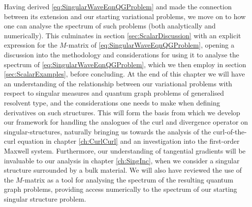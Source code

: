 Having derived \eqref{eq:SingularWaveEqnQGProblem} and made the connection between its extension and our starting variational problems, we move on to how one can analyse the spectrum of such problems (both analytically and numerically).
This culminates in section \ref{sec:ScalarDiscussion} with an explicit expression for the $M$-matrix of \eqref{eq:SingularWaveEqnQGProblem}, opening a discussion into the methodology and considerations for using it to analyse the spectrum of \eqref{eq:SingularWaveEqnQGProblem}, which we then employ in section \ref{sec:ScalarExamples}, before concluding.
At the end of this chapter we will have an understanding of the relationship between our variational problems with respect to singular measures and quantum graph problems of generalised resolvent type, and the considerations one needs to make when defining derivatives on such structures.
This will form the basis from which we develop our framework for handling the analogues of the curl and divergence operator on singular-structures, naturally bringing us towards the analysis of the curl-of-the-curl equation in chapter \ref{ch:CurlCurl} and an investigation into the first-order Maxwell system.
Furthermore, our understanding of tangential gradients will be invaluable to our analysis in chapter \ref{ch:SingInc}, when we consider a singular structure surrounded by a bulk material.
We will also have reviewed the use of the $M$-matrix as a tool for analysing the spectrum of the resulting quantum graph problems, providing access numerically to the spectrum of our starting singular structure problem.